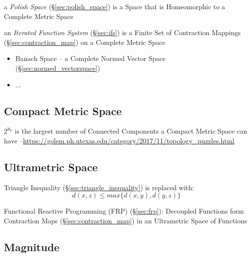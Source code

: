 a \emph{Polish Space} (\S\ref{sec:polish_space}) is a Space that is Homeomorphic
to a Complete Metric Space

\fist an \emph{Iterated Function System} (\S\ref{sec:ifs}) is a Finite Set of
Contraction Mappings (\S\ref{sec:contraction_map}) on a Complete Metric Space

\begin{itemize}
  \item Banach Space -- a Complete Normed Vector Space
    (\S\ref{sec:normed_vectorspace})
  \item ...
\end{itemize}



\subsection{Compact Metric Space}\label{sec:compact_metric_space}

$2^{\aleph_0}$ is the largest number of Connected Components a Compact Metric
Space can have
--\url{https://golem.ph.utexas.edu/category/2017/11/topology_puzzles.html}



\subsection{Ultrametric Space}\label{sec:ultrametric_space}

Triangle Inequality (\S\ref{sec:triangle_inequality}) is replaced
with:
\[
  d(x,z) \leq max\{d(x,y),d(y,z)\}
\]

Functional Reactive Programming (FRP) (\S\ref{sec:frp}): Decoupled
Functions form Contraction Maps (\S\ref{sec:contraction_map}) in an
Ultrametric Space of Functions



\subsection{Magnitude}\label{sec:magnitude}

